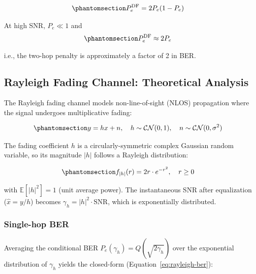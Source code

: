 \begin{equation}\protect\phantomsection\label{eq:equal-hop-snr}{P_e^{\text{DF}} = 2P_e(1 - P_e)}
\end{equation}

At high SNR, \(P_e \ll 1\) and
\begin{equation}\protect\phantomsection\label{eq:df-high-snr-two-hop-penalty}{P_e^{\text{DF}} \approx 2P_e}
\end{equation}
i.e., the two-hop penalty is approximately a factor of 2 in BER.

\subsection{Rayleigh Fading Channel: Theoretical Analysis}\label{sec:rayleigh-fading-channel-theoretical-analysis}

The Rayleigh fading channel models non-line-of-sight (NLOS) propagation where the signal undergoes multiplicative fading:

\begin{equation}\protect\phantomsection\label{eq:rayleigh-channel}{y = hx + n, \quad h \sim \mathcal{CN}(0, 1), \quad n \sim \mathcal{CN}(0, \sigma^2)
}\end{equation}

The fading coefficient \(h\) is a circularly-symmetric complex Gaussian random variable, so its magnitude \(|h|\) follows a Rayleigh distribution:

\begin{equation}\protect\phantomsection\label{eq:rayleigh-pdf}{f_{|h|}(r) = 2r \cdot e^{-r^2}, \quad r \geq 0
}\end{equation}

with \(\mathbb{E}[|h|^2] = 1\) (unit average power). The instantaneous SNR after equalization (\(\hat{x} = y/h\)) becomes \(\gamma_h = |h|^2 \cdot \text{SNR}\), which is exponentially distributed.

\subsubsection{Single-hop BER}\label{sec:rayleigh-single-hop-ber}
Averaging the conditional BER \(P_e(\gamma_h) = Q(\sqrt{2\gamma_h})\) over the exponential distribution of \(\gamma_h\) yields the closed-form \cite[Eq.~14-4-15]{ProakisSalehi2008DigitalComm} (Equation~\ref{eq:rayleigh-ber}):

